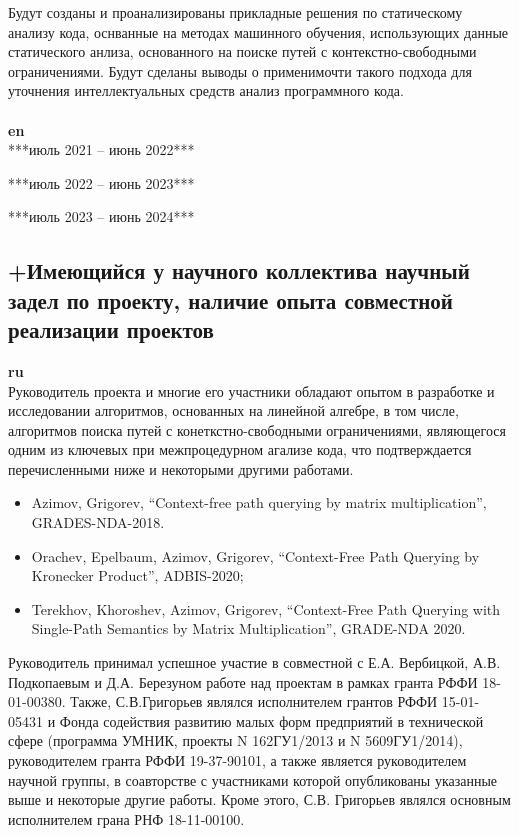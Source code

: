 \documentclass[12pt]{article}  %
\theoremstyle{remark}
\begin{document}
Будут созданы и проанализированы прикладные решения по статическому анализу кода, оснванные на методах машинного обучения, использующих данные статического анлиза, основанного на поиске путей с контекстно-свободными ограничениями. Будут сделаны выводы о применимочти такого подхода для уточнения интеллектуальных средств анализ программного кода.
\\
\\
\textbf{en}\\

***июль 2021 -- июнь 2022***


***июль 2022 -- июнь 2023***


***июль 2023 -- июнь 2024***


\subsection{+Имеющийся у научного коллектива научный задел по проекту, наличие опыта совместной реализации проектов}

\textbf{ru}\\

Руководитель проекта и многие его участники обладают опытом в разработке и исследовании алгоритмов, основанных на линейной алгебре, в том числе, алгоритмов поиска путей с конеткстно-свободными ограничениями, являющегося одним из ключевых при межпроцедурном агализе кода, что подтверждается перечисленными ниже и некоторыми другими работами.
\begin{itemize}
  \item Azimov, Grigorev, ``Context-free path querying by matrix multiplication'', GRADES-NDA-2018.
  \item Orachev, Epelbaum, Azimov, Grigorev, ``Context-Free Path Querying by Kronecker Product'', ADBIS-2020;
  \item Terekhov, Khoroshev, Azimov, Grigorev, ``Context-Free Path Querying with Single-Path Semantics by Matrix Multiplication'', GRADE-NDA 2020.
\end{itemize}

Руководитель принимал успешное участие в совместной с Е.А. Вербицкой, А.В. Подкопаевым и Д.А. Березуном работе над проектам в рамках гранта РФФИ 18-01-00380. Также, С.В.Григорьев являлся исполнителем грантов РФФИ 15-01-05431 и Фонда содействия развитию малых форм предприятий в технической сфере (программа УМНИК, проекты N 162ГУ1/2013 и N 5609ГУ1/2014), руководителем гранта РФФИ 19-37-90101, а также является руководителем научной группы, в соавторстве с участниками которой опубликованы указанные выше и некоторые другие работы. Кроме этого, С.В. Григорьев являлся основным исполнителем грана РНФ 18-11-00100.  
\end{document}
